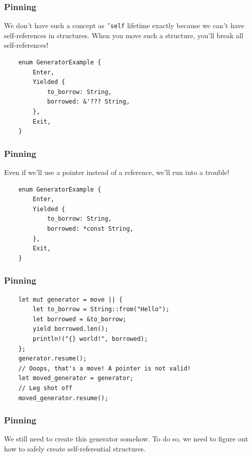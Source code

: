 \documentclass[aspectratio=1610,t]{beamer}
\begin{document}

\begin{frame}[fragile]
\frametitle{Pinning}
We don't have such a concept as \texttt{'self} lifetime exactly because we can't have self-references in structures. When you move such a structure, you'll break all self-references!

\begin{verbatim}
    enum GeneratorExample {
        Enter,
        Yielded {
            to_borrow: String,
            borrowed: &'??? String,
        },
        Exit,
    }
\end{verbatim}
\end{frame}


\begin{frame}[fragile]
\frametitle{Pinning}
Even if we'll use a pointer instead of a reference, we'll run into a trouble!

\begin{verbatim}
    enum GeneratorExample {
        Enter,
        Yielded {
            to_borrow: String,
            borrowed: *const String,
        },
        Exit,
    }
\end{verbatim}
\end{frame}


\begin{frame}[fragile]
\frametitle{Pinning}
\begin{verbatim}
    let mut generator = move || {
        let to_borrow = String::from("Hello");
        let borrowed = &to_borrow;
        yield borrowed.len();
        println!("{} world!", borrowed);
    };
    generator.resume();
    // Ooops, that's a move! A pointer is not valid!
    let moved_generator = generator;
    // Leg shot off
    moved_generator.resume();
\end{verbatim}
\end{frame}


\begin{frame}[fragile]
\frametitle{Pinning}
We still need to create this generator somehow. To do so, we need to figure out how to safely create self-referential structures.


\end{frame}
\end{document}
